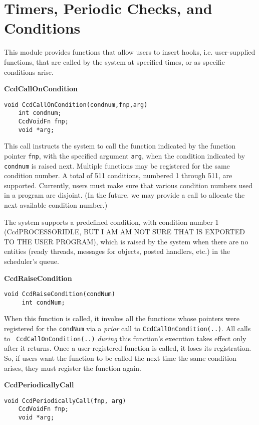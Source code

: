 

\chapter{Timers, Periodic Checks, and Conditions}

This module provides functions that allow users to insert hooks,
i.e. user-supplied functions, that are called by the system at
specified times, or as specific conditions arise.

{\bf  CcdCallOnCondition}
\begin{verbatim}
void CcdCallOnCondition(condnum,fnp,arg)
    int condnum;
    CcdVoidFn fnp;
    void *arg;      
\end{verbatim}

This call instructs the system to call the function indicated by the
function pointer {\tt fnp}, with the specified argument {\tt arg}, when the
condition indicated by {\tt condnum} is raised next. Multiple functions may
be registered for the same condition number. A total of 511
conditions, numbered 1 through 511, are supported.  Currently, users
must make sure that various condition numbers used in a program are
disjoint.  (In the future, we may provide a call to allocate the next
available condition number.)

The system supports a predefined condition, with condition number 1
(CcdPROCESSORIDLE, BUT I AM AM NOT SURE THAT IS EXPORTED TO THE USER
PROGRAM), which is raised by the system when there are no entities
(ready threads, messages for objects, posted handlers, etc.) in the
scheduler's queue.

\vspace*{0.2in}
{\bf  CcdRaiseCondition}
\begin{verbatim}
void CcdRaiseCondition(condNum)
     int condNum;
\end{verbatim}

When this function is called, it invokes all the functions whose
pointers were registered for the \verb#condNum# via a {\em prior} call
to {\tt CcdCallOnCondition(..)}.  All calls to {\tt
CcdCallOnCondition(..)} {\em during} this function's execution takes
effect only after it returns.  Once a user-registered
function is called, it loses its registration.  So, if users want the
function to be called the next time the same condition arises, they
must register the function again.

\vspace*{0.2in}
{\bf  CcdPeriodicallyCall}
\begin{verbatim}
void CcdPeriodicallyCall(fnp, arg)
    CcdVoidFn fnp;
    void *arg;  
\end{verbatim}

